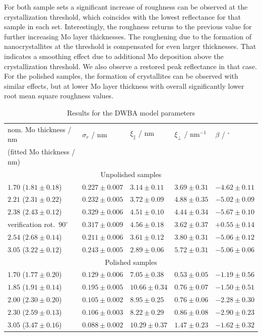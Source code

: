 For both sample sets a significant increase of roughness can be observed at the crystallization threshold, which coincides with the lowest reflectance for that sample in each set. Interestingly, the roughness returns to the previous value for further increasing Mo layer thicknesses. The roughening due to the formation of nanocrystallites at the threshold is compensated for even larger thicknesses.
That indicates a smoothing effect due to additional Mo deposition above the crystallization threshold. We also observe a restored peak reflectance in that case. For the polished samples, the formation of crystallites can be observed with similar effects, but at lower Mo layer thickness with overall significantly lower root mean square roughness values.

\begin{table}[htbp]
\centering
\caption{Results for the DWBA model parameters}
\label{tbl:diffuse_parameters_results}
\begin{tabular}{@{}lllll@{}}
\toprule
nom. Mo thickness / nm&$\sigma_r$ / nm & $\xi_\parallel$ / nm & $\xi_\perp$  / nm$^{-1}$ & $\beta$ / $^\circ$ \\ 
(fitted Mo thickness / nm) & & & &\\ \midrule
\multicolumn{5}{c}{Unpolished samples}\\
\midrule
$1.70$ ($1.81 \pm 0.18$) & $0.227 \pm 0.007$ & $3.14 \pm 0.11$ & $3.69 \pm 0.31$ & $-4.62 \pm 0.11$ \\
$2.21$ ($2.31 \pm 0.22$)& $0.232 \pm 0.005$ & $3.72 \pm 0.09$ & $4.88 \pm 0.35$ & $-5.02 \pm 0.09$ \\
$2.38$ ($2.43 \pm 0.12$) & $0.329 \pm 0.006$ & $4.51 \pm 0.10$ & $4.44 \pm 0.34$ & $-5.67 \pm 0.10$ \\
verification rot.~$90^\circ$ & $0.317 \pm 0.009$ & $4.56 \pm 0.18$ & $3.62 \pm 0.37$ & $+0.55 \pm 0.14$ \\
$2.54$ ($2.68 \pm 0.14$)& $0.211 \pm 0.006$ & $3.61 \pm 0.12$ & $3.80 \pm 0.31$ & $-5.06 \pm 0.12$ \\
$3.05$ ($3.22 \pm 0.12$)& $0.243 \pm 0.005$ & $2.89 \pm 0.06$ & $5.72 \pm 0.31$ & $-5.06 \pm 0.06$ \\
\midrule
\multicolumn{5}{c}{Polished samples}\\
\midrule
$1.70$ ($1.77 \pm 0.20$) & $0.129 \pm 0.006$ & $7.05 \pm 0.38$ & $0.53 \pm 0.05$ & $-1.19 \pm 0.56$ \\
$1.85$ ($1.91 \pm 0.14$)& $0.195 \pm 0.005$ & $10.66 \pm 0.34$ & $0.76 \pm 0.07$ & $-1.50 \pm 0.51$ \\
$2.00$ ($2.30 \pm 0.20$)& $0.105 \pm 0.002$ & $8.95 \pm 0.25$ & $0.76 \pm 0.06$ & $-2.28 \pm 0.30$ \\
$2.30$ ($2.59 \pm 0.13$)& $0.106 \pm 0.003$ & $8.22 \pm 0.29$ & $0.86 \pm 0.08$ & $-2.90 \pm 0.23$ \\
$3.05$ ($3.47 \pm 0.16$)& $0.088 \pm 0.002$ & $10.29 \pm 0.37$ & $1.47 \pm 0.23$ & $-1.62 \pm 0.32$ \\
 \bottomrule
\end{tabular}
\end{table}

